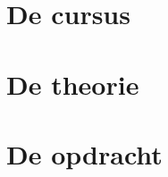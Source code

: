 \documentclass[dutch,a4paper,12pt,doubleside]{book}
\begin{document}
{\hypersetup{linkcolor=black}
\tableofcontents
}


\part{De cursus}


\part{De theorie}





\part{De opdracht}










\end{document}
